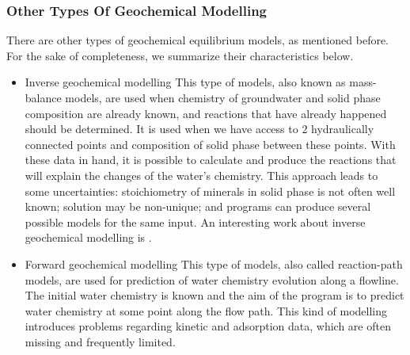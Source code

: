 \subsubsection{Other Types Of Geochemical Modelling}
There are other types of geochemical equilibrium models, as mentioned before. For the sake of completeness, we summarize their characteristics below. 
\begin{itemize}
\item Inverse geochemical modelling
This type of models, also known as mass-balance models, are used when chemistry of groundwater and solid phase composition are already known, and reactions that have already happened should be determined. It is used when we have access to 2 hydraulically connected points and composition of solid phase between these points. With these data in hand, it is possible to calculate and produce the reactions that will explain the changes of the water's chemistry. This approach leads to some uncertainties: stoichiometry of minerals in solid phase is not often well known; solution may be non-unique; and programs can produce several possible models for the same input. An interesting work about inverse geochemical modelling is \cite{Sharif:07}.

\item Forward geochemical modelling
This type of models, also called reaction-path models, are used for prediction of water chemistry evolution along a flowline. The initial water chemistry is known and the aim of the program is to predict water chemistry at some point along the flow path. This kind of modelling introduces problems regarding kinetic and adsorption data, which are often missing and frequently limited.
\end{itemize}

\newpage

